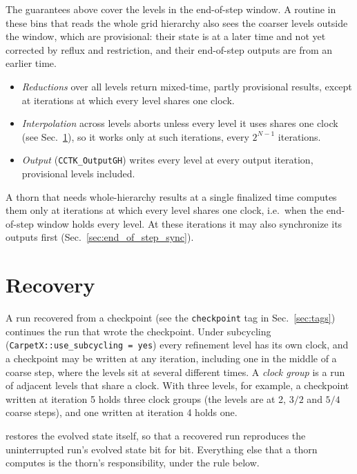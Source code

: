 The guarantees above cover the levels in the end-of-step window. A routine in these bins that reads the whole grid hierarchy also sees the coarser levels outside the window, which are provisional: their state is at a later time and not yet corrected by reflux and restriction, and their end-of-step outputs are from an earlier time.
%
\begin{itemize}
\item \emph{Reductions} over all levels return mixed-time, partly provisional results, except at iterations at which every level shares one clock.
\item \emph{Interpolation} across levels aborts unless every level it uses shares one clock (see Sec.~\ref{sec:recovery}), so it works only at such iterations, every $2^{N-1}$ iterations.
\item \emph{Output} (\texttt{CCTK\_OutputGH}) writes every level at every output iteration, provisional levels included.
\end{itemize}
%
A thorn that needs whole-hierarchy results at a single finalized time computes them only at iterations at which every level shares one clock, i.e.\ when the end-of-step window holds every level. At these iterations it may also synchronize its outputs first (Sec.~\ref{sec:end_of_step_sync}).

\section{Recovery}
\label{sec:recovery}

A run recovered from a checkpoint (see the \texttt{checkpoint} tag in Sec.~\ref{sec:tags}) continues the run that wrote the checkpoint. Under subcycling (\texttt{CarpetX::use\_subcycling = yes}) every refinement level has its own clock, and a checkpoint may be written at any iteration, including one in the middle of a coarse step, where the levels sit at several different times. A \emph{clock group} is a run of adjacent levels that share a clock. With three levels, for example, a checkpoint written at iteration 5 holds three clock groups (the levels are at 2, $3/2$ and $5/4$ coarse steps), and one written at iteration 4 holds one.

\CarpetX\space restores the evolved state itself, so that a recovered run reproduces the uninterrupted run's evolved state bit for bit. Everything else that a thorn computes is the thorn's responsibility, under the rule below.

